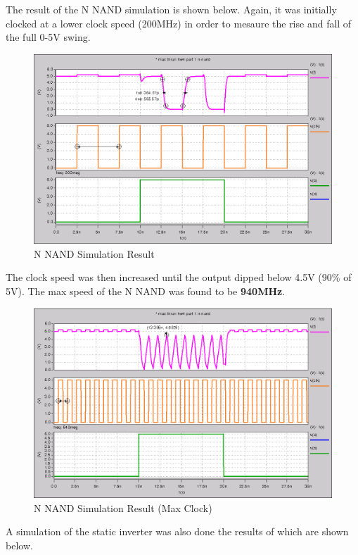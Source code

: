 \documentclass{article}
\begin{document}
\newpage
The result of the N NAND simulation is shown below. Again, it was
initially clocked at a lower clock speed (200MHz) in order to mesaure the
rise and fall of the full 0-5V swing.

\begin{figure}[H]
    \centering
    \includegraphics[width=0.8\linewidth]{../part_1_n_nand.png}
    \caption{N NAND Simulation Result}
\end{figure}

The clock speed was then increased until the output dipped below 4.5V (90\% of
5V). The max speed of the N NAND was found to be \textbf{940MHz}.

\begin{figure}[H]
    \centering
    \includegraphics[width=0.8\linewidth]{../part_1_n_nand_fast.png}
    \caption{N NAND Simulation Result (Max Clock)}
\end{figure}

\newpage
A simulation of the static inverter was also done the results of which are shown below.
\end{document}
